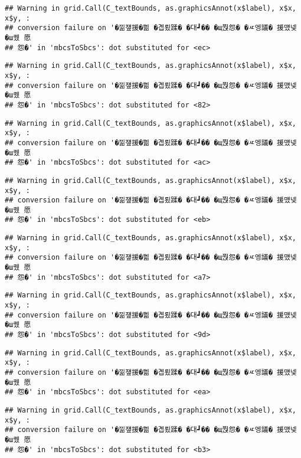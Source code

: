 \documentclass[
]{article}
\begin{document}
\begin{verbatim}
## Warning in grid.Call(C_textBounds, as.graphicsAnnot(x$label), x$x, x$y, :
## conversion failure on '�낆쟾援�쁾 �곕룄蹂� �대┛�� �щ쭩怨� �ㅼ엥議� 援먰넻�ш퀬 愿
## 怨�' in 'mbcsToSbcs': dot substituted for <ec>
\end{verbatim}

\begin{verbatim}
## Warning in grid.Call(C_textBounds, as.graphicsAnnot(x$label), x$x, x$y, :
## conversion failure on '�낆쟾援�쁾 �곕룄蹂� �대┛�� �щ쭩怨� �ㅼ엥議� 援먰넻�ш퀬 愿
## 怨�' in 'mbcsToSbcs': dot substituted for <82>
\end{verbatim}

\begin{verbatim}
## Warning in grid.Call(C_textBounds, as.graphicsAnnot(x$label), x$x, x$y, :
## conversion failure on '�낆쟾援�쁾 �곕룄蹂� �대┛�� �щ쭩怨� �ㅼ엥議� 援먰넻�ш퀬 愿
## 怨�' in 'mbcsToSbcs': dot substituted for <ac>
\end{verbatim}

\begin{verbatim}
## Warning in grid.Call(C_textBounds, as.graphicsAnnot(x$label), x$x, x$y, :
## conversion failure on '�낆쟾援�쁾 �곕룄蹂� �대┛�� �щ쭩怨� �ㅼ엥議� 援먰넻�ш퀬 愿
## 怨�' in 'mbcsToSbcs': dot substituted for <eb>
\end{verbatim}

\begin{verbatim}
## Warning in grid.Call(C_textBounds, as.graphicsAnnot(x$label), x$x, x$y, :
## conversion failure on '�낆쟾援�쁾 �곕룄蹂� �대┛�� �щ쭩怨� �ㅼ엥議� 援먰넻�ш퀬 愿
## 怨�' in 'mbcsToSbcs': dot substituted for <a7>
\end{verbatim}

\begin{verbatim}
## Warning in grid.Call(C_textBounds, as.graphicsAnnot(x$label), x$x, x$y, :
## conversion failure on '�낆쟾援�쁾 �곕룄蹂� �대┛�� �щ쭩怨� �ㅼ엥議� 援먰넻�ш퀬 愿
## 怨�' in 'mbcsToSbcs': dot substituted for <9d>
\end{verbatim}

\begin{verbatim}
## Warning in grid.Call(C_textBounds, as.graphicsAnnot(x$label), x$x, x$y, :
## conversion failure on '�낆쟾援�쁾 �곕룄蹂� �대┛�� �щ쭩怨� �ㅼ엥議� 援먰넻�ш퀬 愿
## 怨�' in 'mbcsToSbcs': dot substituted for <ea>
\end{verbatim}

\begin{verbatim}
## Warning in grid.Call(C_textBounds, as.graphicsAnnot(x$label), x$x, x$y, :
## conversion failure on '�낆쟾援�쁾 �곕룄蹂� �대┛�� �щ쭩怨� �ㅼ엥議� 援먰넻�ш퀬 愿
## 怨�' in 'mbcsToSbcs': dot substituted for <b3>
\end{verbatim}
\end{document}
